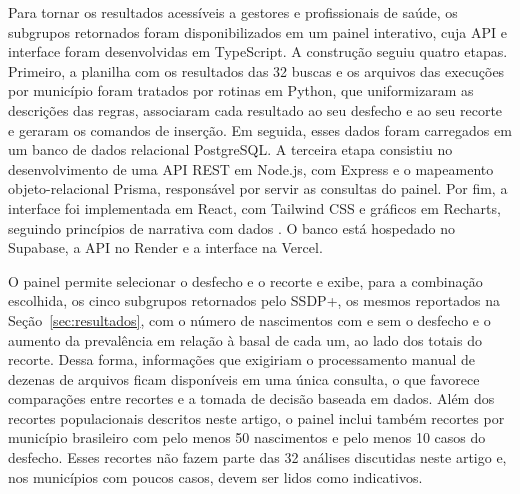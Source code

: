 Para tornar os resultados acessíveis a gestores e profissionais de saúde, os subgrupos retornados foram disponibilizados em um painel interativo, cuja API e interface foram desenvolvidas em TypeScript. A construção seguiu quatro etapas. Primeiro, a planilha com os resultados das 32 buscas e os arquivos das execuções por município foram tratados por rotinas em Python, que uniformizaram as descrições das regras, associaram cada resultado ao seu desfecho e ao seu recorte e geraram os comandos de inserção. Em seguida, esses dados foram carregados em um banco de dados relacional PostgreSQL. A terceira etapa consistiu no desenvolvimento de uma API REST em Node.js, com Express e o mapeamento objeto-relacional Prisma, responsável por servir as consultas do painel. Por fim, a interface foi implementada em React, com Tailwind CSS e gráficos em Recharts, seguindo princípios de narrativa com dados \cite{knaflic2015}. O banco está hospedado no Supabase, a API no Render e a interface na Vercel.

O painel permite selecionar o desfecho e o recorte e exibe, para a combinação escolhida, os cinco subgrupos retornados pelo SSDP+, os mesmos reportados na Seção~\ref{sec:resultados}, com o número de nascimentos com e sem o desfecho e o aumento da prevalência em relação à basal de cada um, ao lado dos totais do recorte. Dessa forma, informações que exigiriam o processamento manual de dezenas de arquivos ficam disponíveis em uma única consulta, o que favorece comparações entre recortes e a tomada de decisão baseada em dados.
Além dos recortes populacionais descritos neste artigo, o painel inclui também recortes por município brasileiro com pelo menos 50 nascimentos e pelo menos 10 casos do desfecho. Esses recortes não fazem parte das 32 análises discutidas neste artigo e, nos municípios com poucos casos, devem ser lidos como indicativos.

